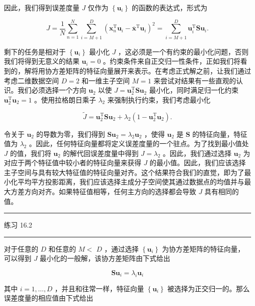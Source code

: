 \documentclass[10pt]{report}
\newcommand{\HRule}{\begin{center}\rule{0.9\linewidth}{0.2mm}\end{center}}
\begin{document}
因此，我们得到误差度量 \(J\) 仅作为 \(\left\{  {\mathbf{u}}_{i}\right\}\) 的函数的表达式，形式为

\[
J = \frac{1}{N}\mathop{\sum }\limits_{{n = 1}}^{N}\mathop{\sum }\limits_{{i = M + 1}}^{D}{\left( {\mathbf{x}}_{n}^{\mathrm{T}}{\mathbf{u}}_{i} - {\overline{\mathbf{x}}}^{\mathrm{T}}{\mathbf{u}}_{i}\right) }^{2} = \mathop{\sum }\limits_{{i = M + 1}}^{D}{\mathbf{u}}_{i}^{\mathrm{T}}\mathbf{S}{\mathbf{u}}_{i}. \tag{16.15}
\]

剩下的任务是相对于 \(\left\{  {\mathbf{u}}_{i}\right\}\) 最小化 \(J\) ，这必须是一个有约束的最小化问题，否则我们将得到无意义的结果 \({\mathbf{u}}_{i} = 0\) 。约束条件来自正交归一性条件，正如我们将看到的，解将用协方差矩阵的特征向量展开来表示。在考虑正式解之前，让我们通过考虑二维数据空间 \(D = 2\) 和一维主子空间 \(M = 1\) 来尝试对结果有一些直观的认识。我们必须选择一个方向 \({\mathbf{u}}_{2}\) 以使 \(J = {\mathbf{u}}_{2}^{\mathrm{T}}\mathbf{S}{\mathbf{u}}_{2}\) 最小化，同时满足归一化约束 \({\mathbf{u}}_{2}^{\mathrm{T}}{\mathbf{u}}_{2} = 1\) 。使用拉格朗日乘子 \({\lambda }_{2}\) 来强制执行约束，我们考虑最小化

\[
\widetilde{J} = {\mathbf{u}}_{2}^{\mathrm{T}}\mathbf{S}{\mathbf{u}}_{2} + {\lambda }_{2}\left( {1 - {\mathbf{u}}_{2}^{\mathrm{T}}{\mathbf{u}}_{2}}\right) . \tag{16.16}
\]

令关于 \({\mathbf{u}}_{2}\) 的导数为零，我们得到 \({\mathbf{{Su}}}_{2} = {\lambda }_{2}{\mathbf{u}}_{2}\) ，使得 \({\mathbf{u}}_{2}\) 是 \(\mathbf{S}\) 的特征向量，特征值为 \({\lambda }_{2}\) 。因此，任何特征向量都将定义误差度量的一个驻点。为了找到最小值处 \(J\) 的值，我们将 \({\mathbf{u}}_{2}\) 的解代回误差度量中得到 \(J = {\lambda }_{2}\) 。因此，我们通过选择 \({\mathbf{u}}_{2}\) 为对应于两个特征值中较小者的特征向量来获得 \(J\) 的最小值。因此，我们应该选择主子空间与具有较大特征值的特征向量对齐。这个结果符合我们的直觉，即为了最小化平均平方投影距离，我们应该选择主成分子空间使其通过数据点的均值并与最大方差方向对齐。如果特征值相等，任何主方向的选择都会导致 \(J\) 具有相同的值。

\HRule

练习 16.2

\HRule

对于任意的 \(D\) 和任意的 \(M <\)  \(D\) ，通过选择 \(\left\{  {\mathbf{u}}_{i}\right\}\) 为协方差矩阵的特征向量，可以得到 \(J\) 最小化的一般解，该协方差矩阵由下式给出

\[
\mathbf{S}{\mathbf{u}}_{i} = {\lambda }_{i}{\mathbf{u}}_{i} \tag{16.17}
\]

其中 \(i = 1,\ldots ,D\) ，并且和往常一样，特征向量 \(\left\{  {\mathbf{u}}_{i}\right\}\) 被选择为正交归一的。那么误差度量的相应值由下式给出
\end{document}
